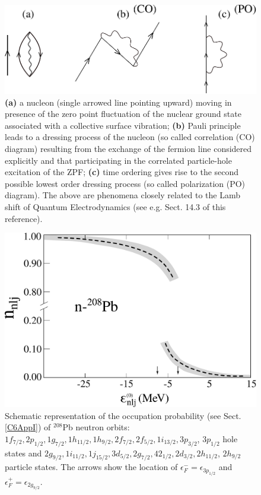 \begin{figure}
	\centerline {
		\includegraphics*[width=12cm]{introduccion/figs/figpreface8}
	}
	\caption{\textbf{(a)} a nucleon (single arrowed line pointing upward) moving in presence of the zero point fluctuation of the nuclear ground state associated with a collective surface vibration; \textbf{(b)} Pauli principle leads to a dressing process of the nucleon (so called correlation (CO) diagram) resulting from the exchange of the fermion line considered explicitly and that participating in the correlated particle-hole excitation of the ZPF; \textbf{(c)} time ordering gives rise to the second possible lowest order dressing  process (so called polarization (PO) diagram). The above are phenomena closely related to the Lamb shift of Quantum Electrodynamics (see e.g. \cite{Weinberg:96} Sect. 14.3 of this reference).}
	\label{fig1.0.8}
\end{figure}
\begin{figure}
	\centerline {
		\includegraphics*[width=12cm]{introduccion/figs/fig1_2_5}
	}
	\caption{Schematic representation of the occupation probability (see Sect. \ref{C6AppI}) of $^{208}$Pb neutron orbits: $1f_{7/2},2p_{1/2},1g_{7/2},1h_{11/2},1h_{9/2},2f_{7/2},2f_{5/2},1i_{13/2},3p_{3/2}$,  $3p_{1/2}$ hole states and $2g_{9/2},1i_{11/2},1j_{15/2},3d_{5/2},2g_{7/2},42_{1/2},2d_{3/2},2h_{11/2}$, $2h_{9/2}$ particle states. The arrows show the location of $\epsilon^-_F=\epsilon_{3p_{1/2}}$ and $\epsilon^+_F=\epsilon_{2g_{9/2}}$.}
	\label{fig1.2.5}
\end{figure}
